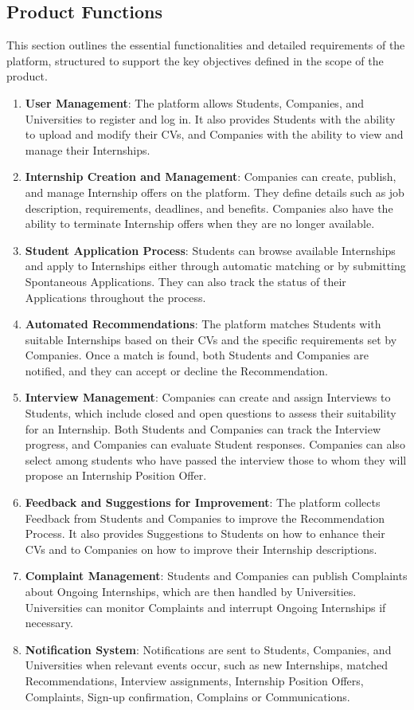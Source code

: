 \subsection{Product Functions}
This section outlines the essential functionalities and detailed requirements of the platform, structured to support the key objectives defined in the scope of the product.
\begin{enumerate}
    \item \textbf{\color{titleColor}User Management}: The platform allows Students, Companies, and Universities to register and log in. It also provides Students with the ability to upload and modify their CVs, and Companies with the ability to view and manage their Internships.
    \item \textbf{\color{titleColor}Internship Creation and Management}: Companies can create, publish, and manage Internship offers on the platform. They define details such as job description, requirements, deadlines, and benefits. Companies also have the ability to terminate Internship offers when they are no longer available.
    \item \textbf{\color{titleColor}Student Application Process}: Students can browse available Internships and apply to Internships either through automatic matching or by submitting Spontaneous Applications. They can also track the status of their Applications throughout the process.
    \item \textbf{\color{titleColor}Automated Recommendations}: The platform matches Students with suitable Internships based on their CVs and the specific requirements set by Companies. Once a match is found, both Students and Companies are notified, and they can accept or decline the Recommendation.
    \item \textbf{\color{titleColor}Interview Management}: Companies can create and assign Interviews to Students, which include closed and open questions to assess their suitability for an Internship. Both Students and Companies can track the Interview progress, and Companies can evaluate Student responses. Companies can also select among students who have passed the interview those to whom they will propose an Internship Position Offer.
    \item \textbf{\color{titleColor}Feedback and Suggestions for Improvement}: The platform collects Feedback from Students and Companies to improve the Recommendation Process. It also provides Suggestions to Students on how to enhance their CVs and to Companies on how to improve their Internship descriptions.
    \item \textbf{\color{titleColor}Complaint Management}: Students and Companies can publish Complaints about Ongoing Internships, which are then handled by Universities. Universities can monitor Complaints and interrupt Ongoing Internships if necessary.
    \item \textbf{\color{titleColor}Notification System}: Notifications are sent to Students, Companies, and Universities when relevant events occur, such as new Internships, matched Recommendations, Interview assignments,  Internship Position Offers, Complaints, Sign-up confirmation, Complains or Communications.
\end{enumerate}

